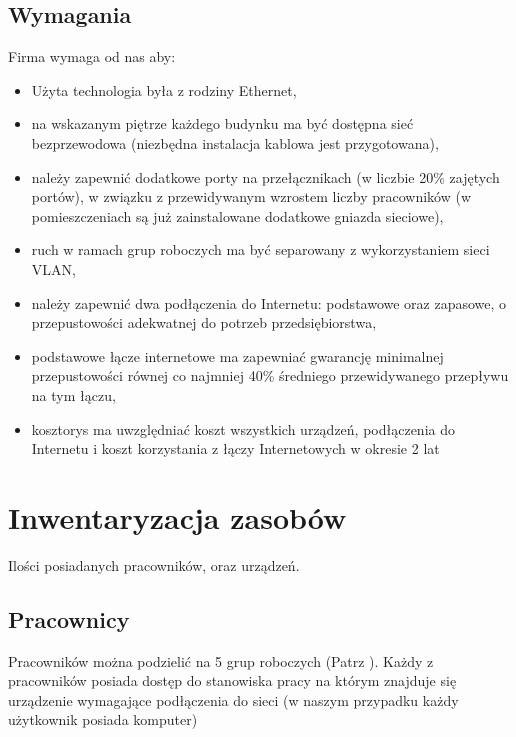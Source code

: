 \documentclass[a4paper,12pt]{extarticle}  %
\begin{document}
\subsection{Wymagania}
Firma wymaga od nas aby:
\begin{itemize}
	\item Użyta technologia była z rodziny Ethernet,
	\item na wskazanym piętrze każdego budynku ma być dostępna sieć bezprzewodowa (niezbędna instalacja
	      kablowa jest przygotowana),
	\item należy zapewnić dodatkowe porty na przełącznikach (w liczbie 20\% zajętych portów), w związku z
	      przewidywanym wzrostem liczby pracowników (w pomieszczeniach są już zainstalowane
	      dodatkowe gniazda sieciowe),
	\item ruch w ramach grup roboczych ma być separowany z wykorzystaniem sieci VLAN,
	\item należy  zapewnić  dwa  podłączenia  do  Internetu:  podstawowe  oraz  zapasowe,  o  przepustowości
	      adekwatnej do potrzeb przedsiębiorstwa,
	\item podstawowe  łącze  internetowe  ma  zapewniać  gwarancję  minimalnej  przepustowości  równej  co
	      najmniej 40\% średniego przewidywanego przepływu na tym łączu,
	\item kosztorys ma uwzględniać koszt wszystkich urządzeń, podłączenia do Internetu i koszt korzystania z
	      łączy Internetowych w okresie 2 lat
\end{itemize}




\section{Inwentaryzacja zasobów}
Ilości posiadanych pracowników, oraz urządzeń.
\subsection{Pracownicy}
Pracowników można podzielić na 5 grup roboczych (Patrz \underline{}).
Każdy z pracowników posiada dostęp do stanowiska pracy na którym znajduje się urządzenie wymagające podłączenia do sieci (w naszym przypadku każdy użytkownik posiada komputer)
\end{document}
